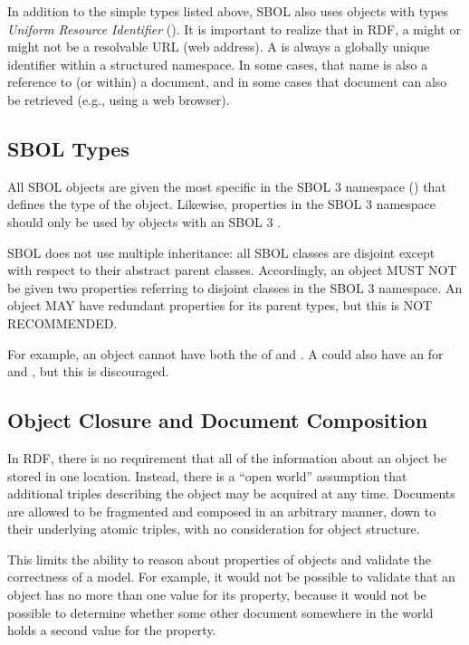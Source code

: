 {In addition to the simple types listed above, SBOL also uses objects with types \emph{Uniform Resource Identifier} (). It is important to realize that in RDF, a  might or might not be a resolvable URL (web address).  A  is always a globally unique identifier within a structured namespace.  In some cases, that name is also a reference to (or within) a document, and in some cases that document can also be retrieved (e.g., using a web browser).


\subsection{SBOL Types}
\label{sec:sbolTypes}

All SBOL objects are given the most specific  in the SBOL 3 namespace () that defines the type of the object.
Likewise, properties in the SBOL 3 namespace should only be used by objects with an SBOL 3 .

SBOL does not use multiple inheritance: all SBOL classes are disjoint except with respect to their abstract parent classes.
Accordingly, an object MUST NOT be given two  properties referring to disjoint classes in the SBOL 3 namespace.
An object MAY have redundant  properties for its parent types, but this is NOT RECOMMENDED.

For example, an object cannot have both the  of  and .  
A  could also have an  for  and , but this is discouraged.


\subsection{Object Closure and Document Composition}

In RDF, there is no requirement that all of the information about an object be stored in one location.  
Instead, there is a ``open world'' assumption that additional triples describing the object may be acquired at any time.
Documents are allowed to be fragmented and composed in an arbitrary manner, down to their underlying atomic triples, with no consideration for object structure.

This limits the ability to reason about properties of objects and validate the correctness of a model.
For example, it would not be possible to validate that an  object has no more than one value for its  property, because it would not be possible to determine whether some other document somewhere in the world holds a second value for the property.

}
